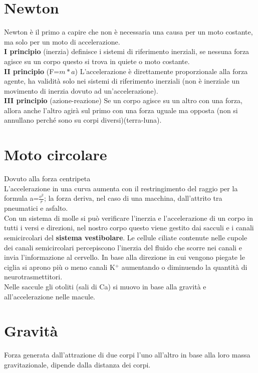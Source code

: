 \documentclass[10pt]{article}
\begin{document}
\section*{Newton}
Newton è il primo a capire che non è necessaria una causa per un moto costante, ma solo per un moto di accelerazione.\\
\textbf{I principio} (inerzia) definisce i sistemi di riferimento inerziali, se nessuna forza agisce su un corpo questo si trova in quiete o moto costante.\\
\textbf{II principio} (F=$m*a$) L'accelerazione è direttamente proporzionale alla forza agente, ha validità solo nei sistemi di riferimento inerziali (non è inerziale un movimento di inerzia dovuto ad un'accelerazione).\\
\textbf{III principio} (azione-reazione) Se un corpo agisce su un altro con una forza, allora anche l'altro agirà sul primo con una forza uguale ma opposta (non si annullano perché sono su corpi diversi)(terra-luna).
\section*{Moto circolare}
Dovuto alla forza centripeta\\
L'accelerazione in una curva aumenta con il restringimento del raggio per la formula a=$\frac{v^2}{r}$; la forza deriva, nel caso di una macchina, dall'attrito tra pneumatici e asfalto. \\
Con un sistema di molle si può verificare l'inerzia e l'accelerazione di un corpo in tutti i versi e direzioni, nel nostro corpo questo viene gestito dai sacculi e i canali semicircolari del \textbf{sistema vestibolare}. Le cellule ciliate contenute nelle cupole dei canali semicircolari percepiscono l'inerzia del fluido che scorre nei canali e invia l'informazione al cervello. In base alla direzione in cui vengono piegate le ciglia si aprono più o meno canali K$^+$ aumentando o diminuendo la quantità di neurotrasmettitori.\\
Nelle saccule gli otoliti (sali di Ca) si muovo in base alla gravità e all'accelerazione nelle macule.
\section*{Gravità}
Forza generata dall'attrazione di due corpi l'uno all'altro in base alla loro massa gravitazionale, dipende dalla distanza dei corpi.
\end{document}
